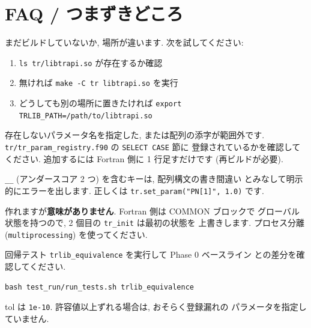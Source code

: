 \documentclass[11pt,a4paper]{report}
\begin{document}
\section{FAQ / つまずきどころ}

\begin{faq}
まだビルドしていないか, 場所が違います. 次を試してください:

\begin{enumerate}
  \item \texttt{ls tr/libtrapi.so} が存在するか確認
  \item 無ければ \texttt{make -C tr libtrapi.so} を実行
  \item どうしても別の場所に置きたければ
        \texttt{export TRLIB\_PATH=/path/to/libtrapi.so}
\end{enumerate}
\end{faq}

\begin{faq}[Q2. \texttt{TrlibParamError: ierr=1} が出る]
存在しないパラメータ名を指定した, または配列の添字が範囲外です.
\texttt{tr/tr\_param\_registry.f90} の \texttt{SELECT CASE} 節に
登録されているかを確認してください. 追加するには Fortran 側に
1 行足すだけです (再ビルドが必要).
\end{faq}

\begin{faq}[Q3. \texttt{set\_params(PN\_\_1=1.0)} と書いてしまった]
\texttt{\_\_} (アンダースコア 2 つ) を含むキーは, 配列構文の書き間違い
とみなして明示的にエラーを出します. 正しくは
\texttt{tr.set\_param("PN[1]", 1.0)} です.
\end{faq}

\begin{faq}
作れますが\textbf{意味がありません}. Fortran 側は COMMON ブロックで
グローバル状態を持つので, 2 個目の \texttt{tr\_init} は最初の状態を
上書きします. プロセス分離 (\texttt{multiprocessing}) を使ってください.
\end{faq}

\begin{faq}
回帰テスト \texttt{trlib\_equivalence} を実行して Phase 0 ベースライン
との差分を確認してください.
\begin{lstlisting}[style=bash]
bash test_run/run_tests.sh trlib_equivalence
\end{lstlisting}
tol は \texttt{1e-10}. 許容値以上ずれる場合は, おそらく登録漏れの
パラメータを指定していません.
\end{faq}
\end{document}
